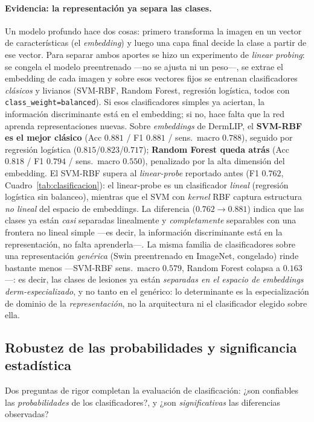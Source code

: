 \documentclass[11pt, a4paper]{article}
\begin{document}
\paragraph{Evidencia: la representación ya separa las clases.} Un modelo profundo hace dos cosas: primero
transforma la imagen en un vector de características (el \emph{embedding}) y luego una capa final decide la
clase a partir de ese vector. Para separar ambos aportes se hizo un experimento de \emph{linear probing}:
se congela el modelo preentrenado —no se ajusta ni un peso—, se extrae el embedding de cada imagen y sobre
esos vectores fijos se entrenan clasificadores \emph{clásicos} y livianos (SVM-RBF, Random Forest,
regresión logística, todos con \texttt{class\_weight=balanced}). Si esos clasificadores simples ya
aciertan, la información discriminante está en el embedding; si no, hace falta que la red aprenda
representaciones nuevas. Sobre \emph{embeddings} de DermLIP, el \textbf{SVM-RBF es el mejor clásico}
(Acc $0.881$ / F1 $0.881$ / sens.\ macro $0.788$), seguido por regresión logística ($0.815$/$0.823$/$0.717$);
\textbf{Random Forest queda atrás} (Acc $0.818$ / F1 $0.794$ / sens.\ macro $0.550$), penalizado por la
alta dimensión del embedding. El SVM-RBF supera al \emph{linear-probe} reportado antes (F1 $0.762$,
Cuadro~\ref{tab:clasificacion}): el linear-probe es un clasificador \emph{lineal} (regresión logística sin
balanceo), mientras que el SVM con \emph{kernel} RBF captura estructura \emph{no lineal} del espacio de
embeddings. La diferencia ($0.762 \to 0.881$) indica que las clases ya están \emph{casi} separadas
linealmente y \emph{completamente} separables con una frontera no lineal simple —es decir, la
información discriminante está en la representación, no falta aprenderla—. La misma familia de
clasificadores sobre una representación \emph{genérica} (Swin preentrenado en ImageNet, congelado) rinde
bastante menos —SVM-RBF sens.\ macro $0.579$, Random Forest colapsa a $0.163$—: es decir, las clases de
lesiones ya están \emph{separadas en el espacio de embeddings derm-especializado}, y no tanto en el
genérico: lo determinante es la especialización de dominio de la \emph{representación}, no la
arquitectura ni el clasificador elegido sobre ella.

\subsection{Robustez de las probabilidades y significancia estadística}
\label{sec:calib}
Dos preguntas de rigor completan la evaluación de clasificación: ¿son confiables las \emph{probabilidades}
de los clasificadores?, y ¿son \emph{significativas} las diferencias observadas?
\end{document}
